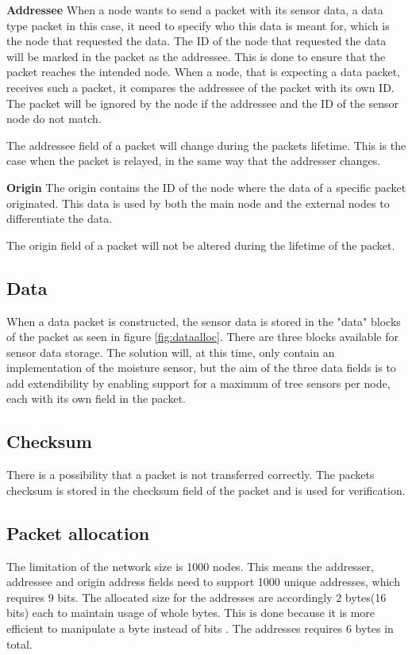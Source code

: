 \textbf{Addressee}\newline
When a node wants to send a packet with its sensor data, a data type packet in this case, it need to specify who this data is meant for, which is the node that requested the data. The ID of the node that requested the data will be marked in the packet as the addressee. This is done to ensure that the packet reaches the intended node. When a node, that is expecting a data packet, receives such a packet, it compares the addressee of the packet with its own ID. The packet will be ignored by the node if the addressee and the ID of the sensor node do not match.

The addressee field of a packet will change during the packets lifetime. This is the case when the packet is relayed, in the same way that the addresser changes.

\textbf{Origin}\newline
The origin contains the ID of the node where the data of a specific packet originated. This data is used by both the main node and the external nodes to differentiate the data.

The origin field of a packet will not be altered during the lifetime of the packet.


\subsection{Data}
When a data packet is constructed, the sensor data is stored in the "data" blocks of the packet as seen in figure \ref{fig:dataalloc}. There are three blocks available for sensor data storage. The solution will, at this time, only contain an implementation of the moisture sensor, but the aim of the three data fields is to add extendibility by enabling support for a maximum of tree sensors per node, each with its own field in the packet.


\subsection{Checksum}
There is a possibility that a packet is not transferred correctly. The packets checksum is stored in the checksum field of the packet and is used for verification.


\subsection{Packet allocation}
The limitation of the network size is 1000 nodes. This means the addresser, addressee and origin address fields need to support 1000 unique addresses, which requires 9 bits. The allocated size for the addresses are accordingly 2 bytes(16 bits) each to maintain usage of whole bytes. This is done because it is more efficient to manipulate a byte instead of bits \cite{bytevsbit}. The addresses requires 6 bytes in total.

